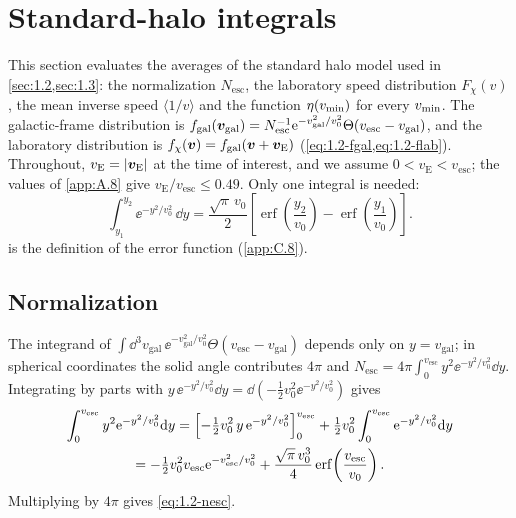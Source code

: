 \section{Standard-halo integrals}\label{app:D.1}

This section evaluates the averages of the standard halo model used in \cref{sec:1.2,sec:1.3}: the normalization $N_{\mathrm{esc}}$, the laboratory speed distribution $F_\chi(v)$, the mean inverse speed $\langle 1/v\rangle$ and the function $\eta(v_{\mathrm{min}})$ for every $v_{\mathrm{min}}$. The galactic-frame distribution is $f_{\mathrm{gal}}(\bm{v}_{\mathrm{gal}}) = N_{\mathrm{esc}}^{-1}\mathrm{e}^{-v_{\mathrm{gal}}^2/v_0^2}\Theta(v_{\mathrm{esc}} - v_{\mathrm{gal}})$, and the laboratory distribution is $f_\chi(\bm{v}) = f_{\mathrm{gal}}(\bm{v} + \bm{v}_{\mathrm{E}})$ (\cref{eq:1.2-fgal,eq:1.2-flab}). Throughout, $v_{\mathrm{E}} = |\bm{v}_{\mathrm{E}}|$ at the time of interest, and we assume $0 < v_{\mathrm{E}} < v_{\mathrm{esc}}$; the values of \cref{app:A.8} give $v_{\mathrm{E}}/v_{\mathrm{esc}} \le 0.49$. Only one integral is needed:
\begin{equation}
  \int_{y_1}^{y_2} \ee^{-y^2/v_0^2}\,\dd y = \frac{\sqrt{\pi}\,v_0}{2}\left[\operatorname{erf}\!\left(\frac{y_2}{v_0}\right) - \operatorname{erf}\!\left(\frac{y_1}{v_0}\right)\right].
  \label{eq:D.1-erf}
\end{equation}
 is the definition of the error function (\cref{app:C.8}).

\subsection*{Normalization}

The integrand of $\int \dd^3 v_{\mathrm{gal}}\,\ee^{-v_{\mathrm{gal}}^2/v_0^2}\Theta(v_{\mathrm{esc}} - v_{\mathrm{gal}})$ depends only on $y = v_{\mathrm{gal}}$; in spherical coordinates the solid angle contributes $4\pi$ and $N_{\mathrm{esc}} = 4\pi\int_0^{v_{\mathrm{esc}}} y^2\ee^{-y^2/v_0^2}\dd y$. Integrating by parts with $y\,\ee^{-y^2/v_0^2}\dd y = \dd(-\tfrac12 v_0^2\ee^{-y^2/v_0^2})$ gives
\begin{multline*}
  \int_0^{v_{\mathrm{esc}}} y^2\mathrm{e}^{-y^2/v_0^2}\mathrm{d} y = \Bigl[-\tfrac12 v_0^2\,y\,\mathrm{e}^{-y^2/v_0^2}\Bigr]_0^{v_{\mathrm{esc}}} + \tfrac12 v_0^2\int_0^{v_{\mathrm{esc}}}\mathrm{e}^{-y^2/v_0^2}\mathrm{d} y\\
  = -\tfrac12 v_0^2 v_{\mathrm{esc}}\mathrm{e}^{-v_{\mathrm{esc}}^2/v_0^2} + \frac{\sqrt{\pi}\,v_0^3}{4}\operatorname{erf}\!\left(\frac{v_{\mathrm{esc}}}{v_0}\right).
\end{multline*}
Multiplying by $4\pi$ gives \cref{eq:1.2-nesc}.

